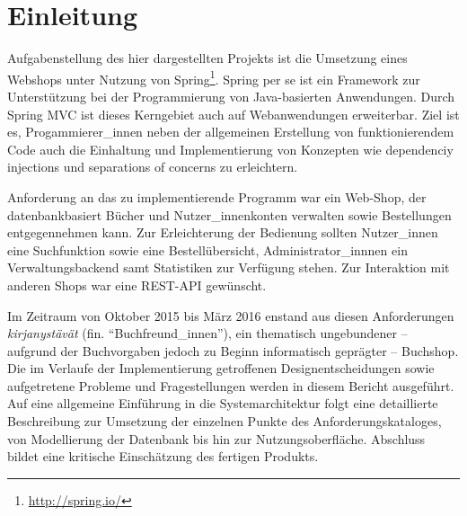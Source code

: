 \section{Einleitung}
	Aufgabenstellung des hier dargestellten Projekts ist die Umsetzung eines Webshops unter Nutzung von Spring\footnote{\hyperlink{http://spring.io/}{http://spring.io/}}. Spring per se ist ein Framework zur Unterstützung bei der Programmierung von Java-basierten Anwendungen. Durch Spring MVC ist dieses Kerngebiet auch auf Webanwendungen erweiterbar. Ziel ist es, Progammierer\_innen neben der allgemeinen Erstellung von funktionierendem Code auch die Einhaltung und Implementierung von Konzepten wie dependenciy injections und separations of concerns zu erleichtern. 
	
	Anforderung an das zu implementierende Programm war ein Web-Shop, der datenbankbasiert Bücher und Nutzer\_innenkonten verwalten sowie Bestellungen entgegennehmen kann. Zur Erleichterung der Bedienung sollten Nutzer\_innen eine Suchfunktion sowie eine Bestellübersicht, Administrator\_innnen ein Verwaltungsbackend samt Statistiken zur Verfügung stehen. Zur Interaktion mit anderen Shops war eine REST-API gewünscht.
	
	Im Zeitraum von Oktober 2015 bis März 2016 enstand aus diesen Anforderungen \textit{kirjan\-ystävät} (fin. "`Buchfreund\_innen"'), ein thematisch ungebundener -- aufgrund der Buchvorgaben jedoch zu Beginn informatisch geprägter -- Buchshop. Die im Verlaufe der Implementierung getroffenen Designentscheidungen sowie aufgetretene Probleme und Fragestellungen werden in diesem Bericht ausgeführt. Auf eine allgemeine Einführung in die Systemarchitektur folgt eine detaillierte Beschreibung zur Umsetzung der einzelnen Punkte des Anforderungskataloges, von Modellierung der Datenbank bis hin zur Nutzungsoberfläche. Abschluss bildet eine kritische Einschätzung des fertigen Produkts. 